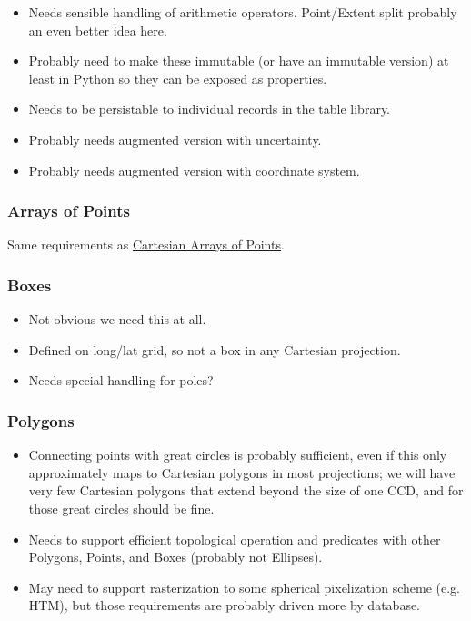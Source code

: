 \begin{itemize}
\item Needs sensible handling of arithmetic operators.  Point/Extent split probably an even better idea here.
\item Probably need to make these immutable (or have an immutable version) at least in Python so they can be exposed as properties.
\item Needs to be persistable to individual records in the table library.
\item Probably needs augmented version with uncertainty.
\item Probably needs augmented version with coordinate system.
\end{itemize}

\subsubsection{Arrays of Points}
\label{sec:spSphericalPointArrays}

Same requirements as \hyperref[sec:spCartesianPointArrays]{Cartesian Arrays of Points}.

\subsubsection{Boxes}
\label{sec:spSphericalBoxes}

\begin{itemize}
\item Not obvious we need this at all.
\item Defined on long/lat grid, so not a box in any Cartesian projection.
\item Needs special handling for poles?
\end{itemize}

\subsubsection{Polygons}
\label{sec:spSphericalPolygons}

\begin{itemize}
\item Connecting points with great circles is probably sufficient, even if this only approximately maps to Cartesian polygons in most projections; we will have very few Cartesian polygons that extend beyond the size of one CCD, and for those great circles should be fine.
\item Needs to support efficient topological operation and predicates with other Polygons, Points, and Boxes (probably not Ellipses).
\item May need to support rasterization to some spherical pixelization scheme (e.g. HTM), but those requirements are probably driven more by database.
\end{itemize}

